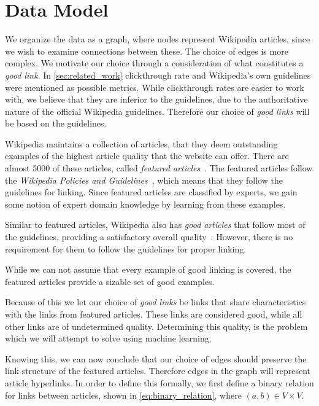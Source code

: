 \section{Data Model}\label{sec:choice_of_graph}
We organize the data as a graph, where nodes represent Wikipedia articles, since we wish to examine connections between these. The choice of edges is more complex. We motivate our choice through a consideration of what constitutes a \emph{good link}. In \cref{sec:related_work} clickthrough rate and Wikipedia's own guidelines were mentioned as possible metrics. While clickthrough rates are easier to work with, we believe that they are inferior to the guidelines, due to the authoritative nature of the official Wikipedia guidelines. Therefore our choice of \emph{good links} will be based on the guidelines.

Wikipedia maintains a collection of articles, that they deem outstanding examples of the highest article quality that the website can offer. There are almost 5000 of these articles, called \emph{featured articles}~\cite{wiki-featured-articles}. The featured articles follow the \emph{Wikipedia Policies and Guidelines}~\cite{wiki-editor-guidelines}, which means that they follow the guidelines for linking. Since featured articles are classified by experts, we gain some notion of expert domain knowledge by learning from these examples.

Similar to featured articles, Wikipedia also has \emph{good articles} that follow most of the guidelines, providing a satisfactory overall quality~\cite{wiki-good-articles}. However, there is no requirement for them to follow the guidelines for proper linking.

While we can not assume that every example of good linking is covered, the featured articles provide a sizable set of good examples. 

Because of this we let our choice of \emph{good links} be links that share characteristics with the links from featured articles. These links are considered good, while all other links are of undetermined quality. Determining this quality, is the problem which we will attempt to solve using machine learning.

Knowing this, we can now conclude that our choice of edges should preserve the link structure of the featured articles. Therefore edges in the graph will represent article hyperlinks. In order to define this formally, we first define a binary relation for links between articles, shown in \cref{eq:binary_relation}, where $(a,b) \in V \times V$.  

